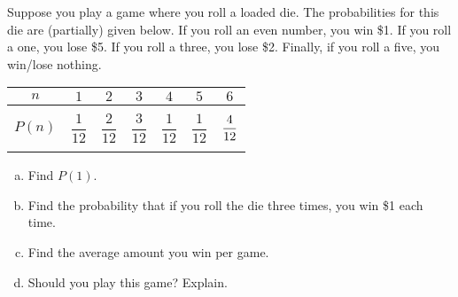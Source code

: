 \documentclass[11pt,letterpaper]{article}
\begin{document}

 Suppose you play a game where you roll a loaded die. The probabilities for this die are (partially) given below. If you roll an even number, you win \$1. If you roll a one, you lose \$5. If you roll a three, you lose \$2. Finally, if you roll a five, you win/lose nothing. 
	\begin{table}[!ht]
	\centering 
	\begin{tabular}{|c||c|c|c|c|c|c|} \hline 
	$n$ & $1$ & $2$ & $3$ & $4$ & $5$ & $6$ \\ \hline 
	$P(n)$ & $\dfrac{\textit{1}}{\textit{12}}$ & $\dfrac{2}{12}$ & $\dfrac{3}{12}$ & $\dfrac{1}{12}$ & $\dfrac{1}{12}$ & $\dfrac{4\rule{0pt}{2.9ex}}{12\rule[-1.3ex]{0pt}{0pt}}$ \\ \hline
	\end{tabular}
	\end{table}

\begin{enumerate}[(a)]
\item Find $P(1)$. 
\item Find the probability that if you roll the die three times, you win \$1 each time. 
\item Find the average amount you win per game. 
\item Should you play this game? Explain.
\end{enumerate} 
\end{document}
